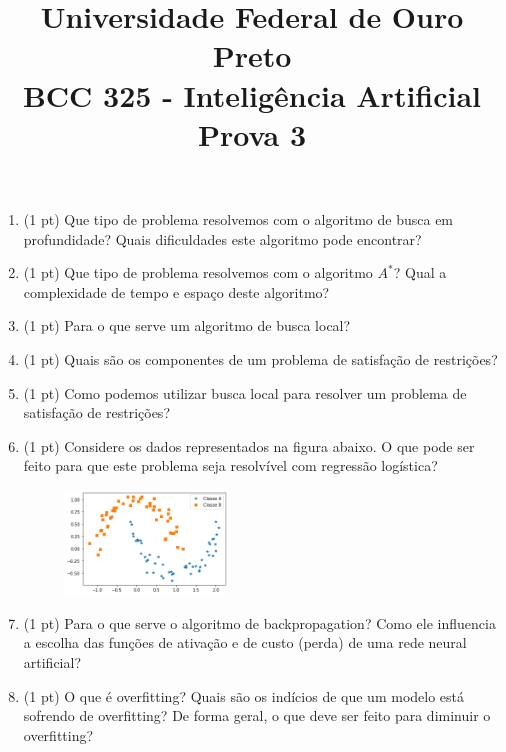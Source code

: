 \documentclass{article}
\title{\vspace{-2 cm} Universidade Federal de Ouro Preto \\ BCC 325 - Inteligência Artificial \\ Prova 3}
\date{}
\begin{document}
\maketitle

\vspace{-2 cm}
\begin{enumerate}

\item (1 pt) Que tipo de problema resolvemos com o algoritmo de busca em profundidade? Quais dificuldades este algoritmo pode encontrar?

\item (1 pt) Que tipo de problema resolvemos com o algoritmo $A^*$? Qual a complexidade de tempo e espaço deste algoritmo?

\item (1 pt) Para o que serve um algoritmo de busca local?

\item (1 pt) Quais são os componentes de um problema de satisfação de restrições?

\item (1 pt) Como podemos utilizar busca local para resolver um problema de satisfação de restrições?

\item (1 pt) Considere os dados representados na figura abaixo. O que pode ser feito para que este problema seja resolvível com regressão logística?

    \begin{figure}[!ht]
        \centering
        \includegraphics[width=0.41\textwidth]{moons.png}
    \end{figure}

\item (1 pt) Para o que serve o algoritmo de backpropagation? Como ele influencia a escolha das funções de ativação e de custo (perda) de uma rede neural artificial?

\item (1 pt) O que é overfitting? Quais são os indícios de que um modelo está sofrendo de overfitting? De forma geral, o que deve ser feito para diminuir o overfitting?


\end{enumerate}
\end{document}
